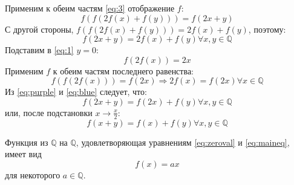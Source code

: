 \documentclass[11pt]{article}
\newcounter{th}\setcounter{th}{0}
\def\th{\par\smallskip\refstepcounter{th}\textbf{\arabic{th}}}
\newtheorem*{Theorem}{Теорема \th}
\begin{document}
Применим к обеим частям \eqref{eq:3} отображение \(f\):
\begin{equation*}
f(f(2f(x) + f(y))) = f(2x + y)
\end{equation*}
С другой стороны, $f(f(2f(x) + f(y))) = 2f(x) + f(y)$, поэтому:
\begin{equation}\label{eq:purple}
f(2x + y) = 2f(x) + f(y) \forall x, y \in \mathbb{Q}
\end{equation}
Подставим в \eqref{eq:1} \(y = 0\):
\begin{equation*}
f(2f(x)) = 2x
\end{equation*}
Применим $f$ к обеим частям последнего равенства:
\begin{equation}\label{eq:blue}
f(f(2f(x))) = f(2x) \Rightarrow 2f(x) = f(2x) \forall x \in \mathbb{Q}
\end{equation}
Из \eqref{eq:purple} и \eqref{eq:blue} следует, что:
\begin{equation*}
f(2x + y) = f(2x) + f(y) \forall x, y \in \mathbb{Q}
\end{equation*}
или, после подстановки $x \to \frac{x}2$:
\begin{equation}\label{eq:maineq}
f(x + y) = f(x) + f(y) \forall x, y \in \mathbb{Q}
\end{equation}
\begin{Theorem}
Функция из $\mathbb{Q}$ на $\mathbb{Q}$, удовлетворяющая уравнениям \eqref{eq:zeroval} и \eqref{eq:maineq}, имеет вид
\begin{equation}\label{eq:funcrepr}
f(x) = ax
\end{equation}
для некоторого $a \in \mathbb{Q}$.
\end{Theorem}
\end{document}
